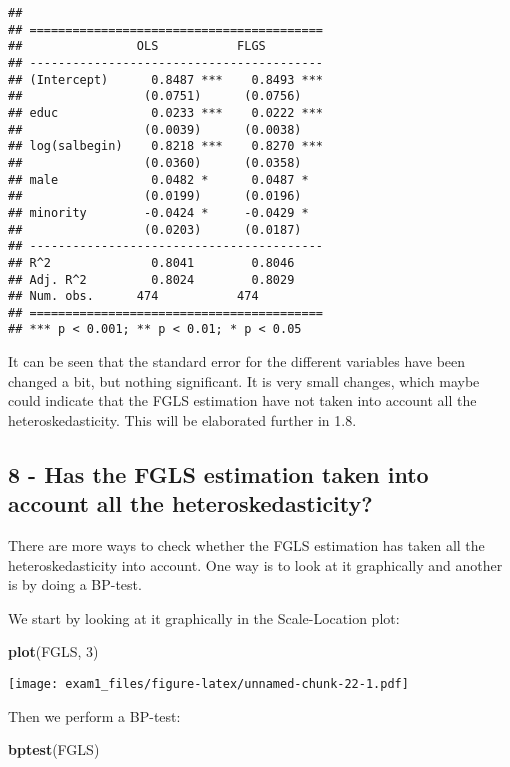 \documentclass[
]{article}
\newenvironment{Shaded}{\begin{snugshade}}{\end{snugshade}}
\newcommand{\DecValTok}[1]{\textcolor[rgb]{0.00,0.00,0.81}{#1}}
\newcommand{\FunctionTok}[1]{\textcolor[rgb]{0.13,0.29,0.53}{\textbf{#1}}}
\newcommand{\NormalTok}[1]{#1}
\begin{document}
\begin{verbatim}
## 
## =========================================
##                OLS           FLGS        
## -----------------------------------------
## (Intercept)      0.8487 ***    0.8493 ***
##                 (0.0751)      (0.0756)   
## educ             0.0233 ***    0.0222 ***
##                 (0.0039)      (0.0038)   
## log(salbegin)    0.8218 ***    0.8270 ***
##                 (0.0360)      (0.0358)   
## male             0.0482 *      0.0487 *  
##                 (0.0199)      (0.0196)   
## minority        -0.0424 *     -0.0429 *  
##                 (0.0203)      (0.0187)   
## -----------------------------------------
## R^2              0.8041        0.8046    
## Adj. R^2         0.8024        0.8029    
## Num. obs.      474           474         
## =========================================
## *** p < 0.001; ** p < 0.01; * p < 0.05
\end{verbatim}

It can be seen that the standard error for the different variables have
been changed a bit, but nothing significant. It is very small changes,
which maybe could indicate that the FGLS estimation have not taken into
account all the heteroskedasticity. This will be elaborated further in
1.8.

\subsection{8 - Has the FGLS estimation taken into account all the
heteroskedasticity?}\label{has-the-fgls-estimation-taken-into-account-all-the-heteroskedasticity}

There are more ways to check whether the FGLS estimation has taken all
the heteroskedasticity into account. One way is to look at it
graphically and another is by doing a BP-test.

We start by looking at it graphically in the Scale-Location plot:

\begin{Shaded}
\begin{Highlighting}[]
\FunctionTok{plot}\NormalTok{(FGLS, }\DecValTok{3}\NormalTok{)}
\end{Highlighting}
\end{Shaded}

\texttt{[image: exam1\_files/figure-latex/unnamed-chunk-22-1.pdf]}

Then we perform a BP-test:

\begin{Shaded}
\begin{Highlighting}[]
\FunctionTok{bptest}\NormalTok{(FGLS)}
\end{Highlighting}
\end{Shaded}
\end{document}

